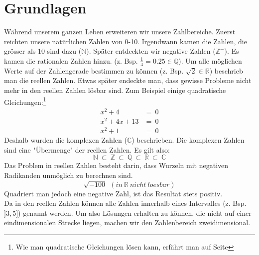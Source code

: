 \documentclass[12pt,a4paper]{scrbook}
\begin{document}
\section{Grundlagen}
Während unserem ganzen Leben erweiteren wir unsere Zahlbereiche. Zuerst
reichten unsere natürlichen Zahlen von 0-10. Irgendwann kamen die Zahlen,
die grösser als 10 sind dazu ($\mathbb{N}$). Später entdeckten wir
negative Zahlen ($\mathbb{Z}^-$). Es kamen die rationalen Zahlen hinzu.
(z. Bsp. $\frac{1}{4} = 0.25 \in \mathbb{Q}$). Um alle möglichen Werte auf
der Zahlengerade bestimmen zu können (z. Bsp. $\sqrt{2} \in \mathbb{R}$)
beschrieb man die reellen Zahlen. Etwas später endeckte man, dass
gewisse Probleme nicht mehr in den reellen Zahlen lösbar sind.
Zum Beispiel einige quadratische Gleichungen:\footnote{Wie man quadratische Gleichungen lösen kann,
erfährt man auf Seite \pageref{quadratische_gleichungen}}
\begin{eqnarray*}
x^2+4 & = ~ 0\\
x^2+4x+13 & = ~ 0\\
x^2+1 & = ~ 0
\end{eqnarray*}
Deshalb wurden die komplexen Zahlen ($\mathbb{C}$) beschrieben. Die komplexen
Zahlen sind eine "Übermenge" der reellen Zahlen. Es gilt also:
\[\mathbb{N} ~ \subset ~ \mathbb{Z} ~ \subset ~ \mathbb{Q} ~ \subset ~ \mathbb{R} ~ \subset ~ \mathbb{C}\]
Das Problem in reellen Zahlen besteht darin, dass Wurzeln mit negativen
Radikanden unmöglich zu berechnen sind.
\[\sqrt{-100} ~~ (in~\mathbb{R}~nicht~loesbar)\]
Quadriert man jedoch eine negative Zahl, ist das Resultat stets positiv.\\
Da in den reellen Zahlen können alle Zahlen innerhalb eines Intervalles (z. Bsp.
$]3, 5]$) genannt werden. Um also Lösungen erhalten zu können, die nicht auf
einer eindimensionalen Strecke liegen, machen wir den Zahlenbereich zweidimensional.
\end{document}
